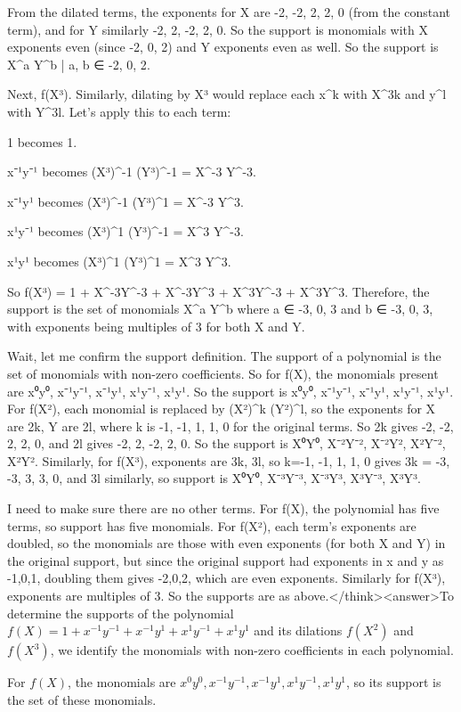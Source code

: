From the dilated terms, the exponents for X are -2, -2, 2, 2, 0 (from the constant term), and for Y similarly -2, 2, -2, 2, 0. So the support is monomials with X exponents even (since -2, 0, 2) and Y exponents even as well. So the support is {X^a Y^b | a, b ∈ {-2, 0, 2}}.

Next, f(X³). Similarly, dilating by X³ would replace each x^k with X^{3k} and y^l with Y^{3l}. Let's apply this to each term:

1 becomes 1.

x⁻¹y⁻¹ becomes (X³)^{-1} (Y³)^{-1} = X^{-3} Y^{-3}.

x⁻¹y¹ becomes (X³)^{-1} (Y³)^1 = X^{-3} Y^3.

x¹y⁻¹ becomes (X³)^1 (Y³)^{-1} = X^3 Y^{-3}.

x¹y¹ becomes (X³)^1 (Y³)^1 = X^3 Y^3.

So f(X³) = 1 + X^{-3}Y^{-3} + X^{-3}Y^3 + X^3Y^{-3} + X^3Y^3. Therefore, the support is the set of monomials X^a Y^b where a ∈ {-3, 0, 3} and b ∈ {-3, 0, 3}, with exponents being multiples of 3 for both X and Y.

Wait, let me confirm the support definition. The support of a polynomial is the set of monomials with non-zero coefficients. So for f(X), the monomials present are x⁰y⁰, x⁻¹y⁻¹, x⁻¹y¹, x¹y⁻¹, x¹y¹. So the support is {x⁰y⁰, x⁻¹y⁻¹, x⁻¹y¹, x¹y⁻¹, x¹y¹}. For f(X²), each monomial is replaced by (X²)^k (Y²)^l, so the exponents for X are 2k, Y are 2l, where k is -1, -1, 1, 1, 0 for the original terms. So 2k gives -2, -2, 2, 2, 0, and 2l gives -2, 2, -2, 2, 0. So the support is {X⁰Y⁰, X⁻²Y⁻², X⁻²Y², X²Y⁻², X²Y²}. Similarly, for f(X³), exponents are 3k, 3l, so k=-1, -1, 1, 1, 0 gives 3k = -3, -3, 3, 3, 0, and 3l similarly, so support is {X⁰Y⁰, X⁻³Y⁻³, X⁻³Y³, X³Y⁻³, X³Y³}.

I need to make sure there are no other terms. For f(X), the polynomial has five terms, so support has five monomials. For f(X²), each term's exponents are doubled, so the monomials are those with even exponents (for both X and Y) in the original support, but since the original support had exponents in x and y as -1,0,1, doubling them gives -2,0,2, which are even exponents. Similarly for f(X³), exponents are multiples of 3. So the supports are as above.</think><answer>To determine the supports of the polynomial \( f(X) = 1 + x^{-1}y^{-1} + x^{-1}y^1 + x^1y^{-1} + x^1y^1 \) and its dilations \( f(X^2) \) and \( f(X^3) \), we identify the monomials with non-zero coefficients in each polynomial.  

For \( f(X) \), the monomials are \( x^0y^0, x^{-1}y^{-1}, x^{-1}y^1, x^1y^{-1}, x^1y^1 \), so its support is the set of these monomials.  

